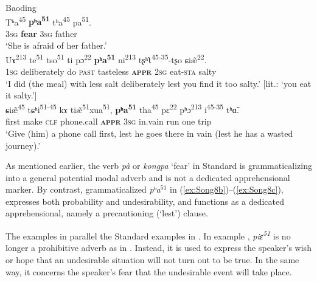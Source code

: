 \documentclass[output=paper,colorlinks,citecolor=brown, language=chinese]{langscibook}
\begin{document}
\ea \label{ex:Song8} \textnormal{Baoding}\\
\ea \label{ex:Song8a}
\gll Tʰa\textsuperscript{45} \textbf{pʰa\textsuperscript{51}} tʰa\textsuperscript{45} pa\textsuperscript{51}. \\
\textsc{3sg} \textbf{fear} \textsc{3sg} father \\
\glt `She is afraid of her father.' \\
\ex \label{ex:Song8b}
\gll Uɤ\textsuperscript{213} te\textsuperscript{51} tso\textsuperscript{51} ti pɔ\textsuperscript{22} \textbf{pʰa\textsuperscript{51}} ni\textsuperscript{213} tʂʰʅ\textsuperscript{45-35}-tʂo ɕiæ̃\textsuperscript{22}. \\
\textsc{1sg} deliberately do \textsc{past} tasteless \textsc{\textbf{appr}} \textsc{2sg} eat-\textsc{sta} salty \\
\glt `I did (the meal) with less salt deliberately lest you find it too salty.' [lit.: `you eat it salty.'] \\
\ex \label{ex:Song8c}
\gll ɕiæ̃\textsuperscript{45} tɕʰi\textsuperscript{51-45} kɤ tiæ̃\textsuperscript{51}xua\textsuperscript{51}, \textbf{pʰa\textsuperscript{51}} tha\textsuperscript{45} pɛ\textsuperscript{22} pʰɔ\textsuperscript{213} i\textsuperscript{45-35} tʰɑ̃. \\
first make \textsc{clf} phone.call \textsc{\textbf{appr}} \textsc{3sg} in.vain run one trip \\
\glt `Give (him) a phone call first, lest he goes there in vain (lest he has a wasted journey).'
\z
\z

 As mentioned earlier, the verb \textit{pà} or \textit{kongpa} `fear' in Standard  is grammaticalizing into a general potential modal adverb and is not a dedicated apprehensional marker. By contrast, grammaticalized \textit{pʰa$^{51}$} in (\ref{ex:Song8b})--(\ref{ex:Song8c}), expresses both probability and undesirability, and functions as a dedicated apprehensional, namely a precautioning (`lest') clause.


The examples in  parallel the Standard  examples in . In example , \textit{piɛ\textsuperscript{51}} is no longer a prohibitive adverb as in . Instead, it is used to express the speaker's wish or hope that an undesirable situation will not turn out to be true. In the same way, it concerns the speaker's fear that the undesirable event will take place. 
\end{document}
